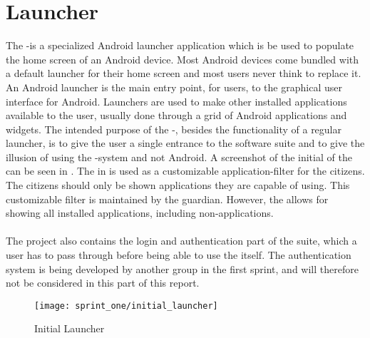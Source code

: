 
\section{Launcher}
The \giraf-\launcher is a specialized Android launcher application which is be used to populate the home screen of an Android device. Most Android devices come bundled with a default launcher for their home screen and most users never think to replace it. An Android launcher is the main entry point, for users, to the graphical user interface for Android. Launchers are used to make other installed applications available to the user, usually done through a grid of Android applications and widgets. The intended purpose of the \giraf-\launcher, besides the functionality of a regular launcher, is to give the user a single entrance to the \giraf software suite and to give the illusion of using the \giraf-system and not Android. A screenshot of the initial  of the \launcher can be seen in . The \launcher in \giraf is used as a customizable application-filter for the citizens. The citizens should only be shown applications they are capable of using. This customizable filter is maintained by the guardian. However, the \launcher allows for showing all installed applications, including non-\giraf applications.
\\\\
The \launcher project also contains the login and authentication part of the \giraf suite, which a user has to pass through before being able to use the \launcher itself. The authentication system is being developed by another group in the first sprint, and will therefore not be considered in this part of this report. 

\begin{figure}[!htbp]
	\centering
	\texttt{[image: sprint\_one/initial\_launcher]}
	\caption{Initial Launcher}
	\label{fig:initial_launcher}
\end{figure}
